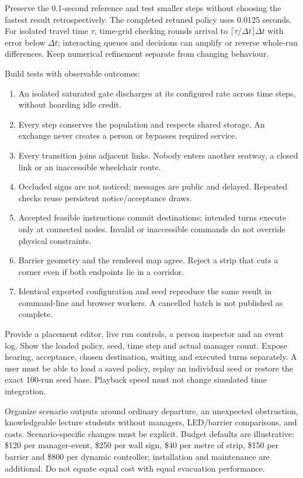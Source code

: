 \documentclass[11pt,a4paper]{article}
\begin{document}
Preserve the 0.1-second reference and test smaller steps without choosing the fastest result retrospectively. The completed retuned policy uses 0.0125 seconds. For isolated travel time $\tau$, time-grid checking rounds arrival to $\lceil\tau/\Delta t\rceil\Delta t$ with error below $\Delta t$; interacting queues and decisions can amplify or reverse whole-run differences. Keep numerical refinement separate from changing behaviour.

Build tests with observable outcomes:
\begin{enumerate}
\item An isolated saturated gate discharges at its configured rate across time steps, without hoarding idle credit.
\item Every step conserves the population and respects shared storage. An exchange never creates a person or bypasses required service.
\item Every transition joins adjacent links. Nobody enters another seatway, a closed link or an inaccessible wheelchair route.
\item Occluded signs are not noticed; messages are public and delayed. Repeated checks reuse persistent notice/acceptance draws.
\item Accepted feasible instructions commit destinations; intended turns execute only at connected nodes. Invalid or inaccessible commands do not override physical constraints.
\item Barrier geometry and the rendered map agree. Reject a strip that cuts a corner even if both endpoints lie in a corridor.
\item Identical exported configuration and seed reproduce the same result in command-line and browser workers. A cancelled batch is not published as complete.
\end{enumerate}

Provide a placement editor, live run controls, a person inspector and an event log. Show the loaded policy, seed, time step and actual manager count. Expose hearing, acceptance, chosen destination, waiting and executed turns separately. A user must be able to load a saved policy, replay an individual seed or restore the exact 100-run seed base. Playback speed must not change simulated time integration.

Organize scenario outputs around ordinary departure, an unexpected obstruction, knowledgeable lecture students without managers, LED/barrier comparisons, and costs. Scenario-specific changes must be explicit. Budget defaults are illustrative: \$120 per manager-event, \$250 per wall sign, \$40 per metre of strip, \$150 per barrier and \$800 per dynamic controller; installation and maintenance are additional. Do not equate equal cost with equal evacuation performance.
\end{document}
